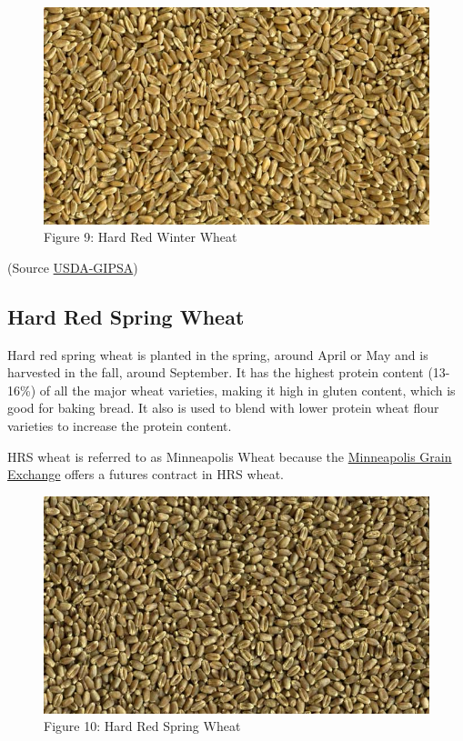 \documentclass[
  letterpaper,
  DIV=11,
  numbers=noendperiod]{scrreprt}
\begin{document}
\begin{figure}

{\centering \includegraphics{images/HRW-Wheat.jpg}

}

\caption{Figure 9: Hard Red Winter Wheat}

\end{figure}

(Source
\href{https://www.gipsa.usda.gov/fgis/commgallery/gr_hrw.aspx}{USDA-GIPSA})

\hypertarget{hard-red-spring-wheat}{%
\subsection{Hard Red Spring Wheat}\label{hard-red-spring-wheat}}

Hard red spring wheat is planted in the spring, around April or May and
is harvested in the fall, around September. It has the highest protein
content (13-16\%) of all the major wheat varieties, making it high in
gluten content, which is good for baking bread. It also is used to blend
with lower protein wheat flour varieties to increase the protein
content.

HRS wheat is referred to as Minneapolis Wheat because the
\href{http://www.mgex.com/}{Minneapolis Grain Exchange} offers a futures
contract in HRS wheat.

\begin{figure}

{\centering \includegraphics{images/HRS-Wheat.jpg}

}

\caption{Figure 10: Hard Red Spring Wheat}

\end{figure}
\end{document}
